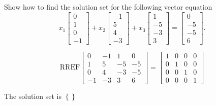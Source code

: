 
\begin{exerciseStatement}


Show how to find the solution set for the following vector equation \[ x_{1} \left[\begin{array}{c}
0 \\
1 \\
0 \\
-1
\end{array}\right] + x_{2} \left[\begin{array}{c}
-1 \\
5 \\
4 \\
-3
\end{array}\right] + x_{3} \left[\begin{array}{c}
1 \\
-5 \\
-3 \\
3
\end{array}\right] = \left[\begin{array}{c}
0 \\
-5 \\
-5 \\
6
\end{array}\right] .\]


\end{exerciseStatement}
    
\begin{exerciseAnswer} 
\[\mathrm{RREF} \left[\begin{array}{ccc|c}
0 & -1 & 1 & 0 \\
1 & 5 & -5 & -5 \\
0 & 4 & -3 & -5 \\
-1 & -3 & 3 & 6
\end{array}\right]  =  \left[\begin{array}{ccc|c}
1 & 0 & 0 & 0 \\
0 & 1 & 0 & 0 \\
0 & 0 & 1 & 0 \\
0 & 0 & 0 & 1
\end{array}\right] \]

The solution set is \( \left\{\right\} \)


\end{exerciseAnswer}
    
